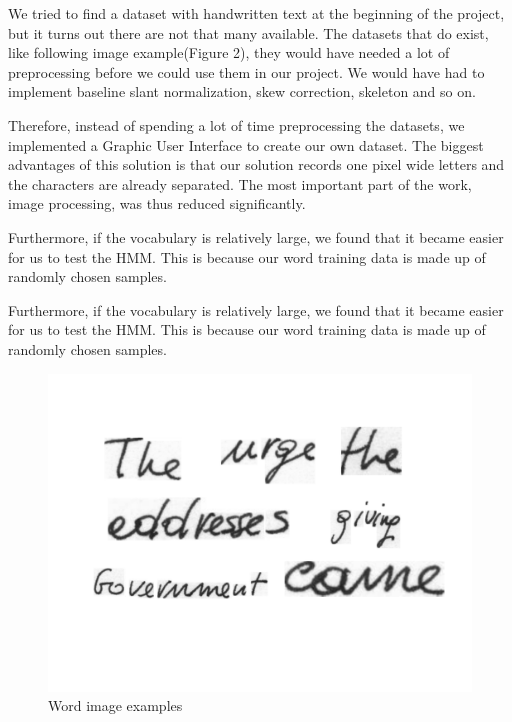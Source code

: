 
We tried to find a dataset with handwritten text at the beginning of the project, but it turns out there are not that many available. 
The datasets that do exist, like following image example(Figure 2), they would have needed a lot of preprocessing before we could use them in our project.
We would have had to implement baseline slant normalization, skew correction, skeleton and so on.

Therefore, instead of spending a lot of time preprocessing the datasets, we implemented a Graphic User Interface to create our own dataset.
The biggest advantages of this solution is that our solution records one pixel wide letters and the characters are already separated. 
The most important part of the work, image processing, was thus reduced significantly.

Furthermore, if the vocabulary is relatively large, we found that it became easier for us to test the HMM.
This is because our word training data is made up of randomly chosen samples.


Furthermore, if the vocabulary is relatively large, we found that it became easier for us to test the HMM.
This is because our word training data is made up of randomly chosen samples.

\begin{figure}[h!]
  \centering
  \includegraphics[width=5in]{datasets_examples}
  \caption{Word image examples}
  \label{figure:wordsexamples}
\end{figure}
